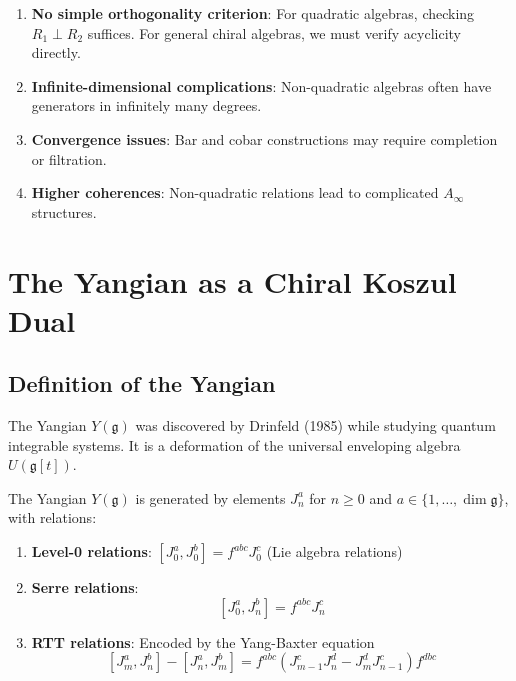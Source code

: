 \begin{enumerate}
\item \textbf{No simple orthogonality criterion}: For quadratic algebras, checking $R_1 \perp R_2$ suffices. For general chiral algebras, we must verify acyclicity directly.

\item \textbf{Infinite-dimensional complications}: Non-quadratic algebras often have generators in infinitely many degrees.

\item \textbf{Convergence issues}: Bar and cobar constructions may require completion or filtration.

\item \textbf{Higher coherences}: Non-quadratic relations lead to complicated $A_\infty$ structures.
\end{enumerate}


\section{The Yangian as a Chiral Koszul Dual}

\subsection{Definition of the Yangian}

The Yangian $Y(\mathfrak{g})$ was discovered by Drinfeld (1985) while studying quantum integrable systems. It is a deformation of the universal enveloping algebra $U(\mathfrak{g}[t])$.

\begin{definition}
The Yangian $Y(\mathfrak{g})$ is generated by elements $J_n^a$ for $n \geq 0$ and $a \in \{1,\ldots,\dim\mathfrak{g}\}$, with relations:
\begin{enumerate}
\item \textbf{Level-0 relations}: $[J_0^a, J_0^b] = f^{abc}J_0^c$ (Lie algebra relations)

\item \textbf{Serre relations}: 
$$[J_0^a, J_n^b] = f^{abc}J_n^c$$

\item \textbf{RTT relations}: Encoded by the Yang-Baxter equation
$$[J_m^a, J_n^b] - [J_n^a, J_m^b] = f^{abc}(J_{m-1}^cJ_n^d - J_m^dJ_{n-1}^c)f^{dbc}$$
\end{enumerate}
\end{definition}

